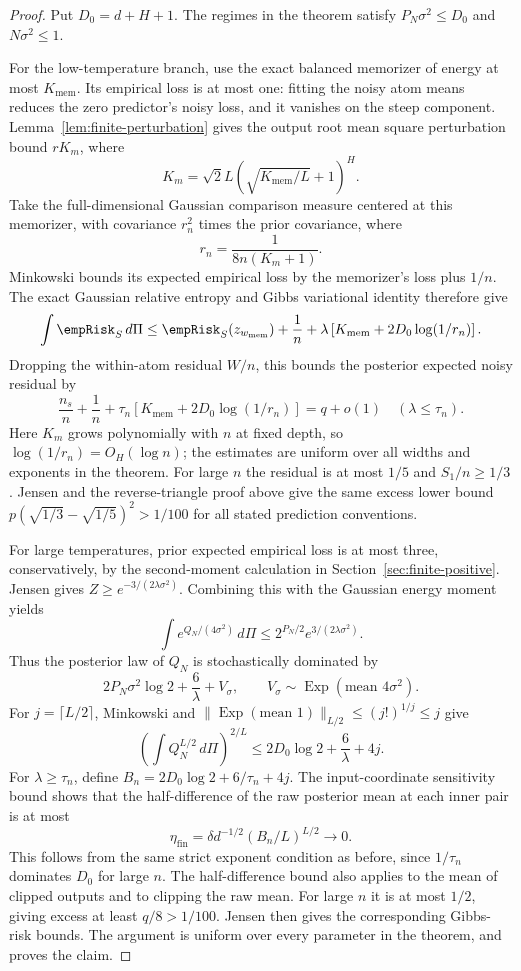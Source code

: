 \begin{proof}
Put $D_0=d+H+1$. The regimes in the theorem satisfy $P_N\sigma^2\le D_0$ and $N\sigma^2\le1$.

For the low-temperature branch, use the exact balanced memorizer of energy at most $K_{\mathrm{mem}}$. Its empirical loss is at most one: fitting the noisy atom means reduces the zero predictor's noisy loss, and it vanishes on the steep component. Lemma~\ref{lem:finite-perturbation} gives the output root mean square perturbation bound $rK_m$, where
\[
 K_m=\sqrt2 L(\sqrt{K_{\mathrm{mem}}/L}+1)^H.
\]
Take the full-dimensional Gaussian comparison measure centered at this memorizer, with covariance $r_n^2$ times the prior covariance, where
\[
 r_n=\frac1{8n(K_m+1)}.
\]
Minkowski bounds its expected empirical loss by the memorizer's loss plus $1/n$. The exact Gaussian relative entropy and Gibbs variational identity therefore give
\[
 \int\empRisk_S\,d\Pi\le
 \empRisk_S(z_{w_{\mathrm{mem}}})+\frac1n
   +\lambda\left[K_{\mathrm{mem}}+2D_0\log(1/r_n)\right].
\]
Dropping the within-atom residual $W/n$, this bounds the posterior expected noisy residual by
\[
 \frac{n_s}n+\frac1n+
       \tau_n\left[K_{\mathrm{mem}}+2D_0\log(1/r_n)\right]
       =q+o(1)
 \quad(\lambda\le\tau_n).
\]
Here $K_m$ grows polynomially with $n$ at fixed depth, so $\log(1/r_n)=O_H(\log n)$; the estimates are uniform over all widths and exponents in the theorem. For large $n$ the residual is at most $1/5$ and $S_1/n\ge1/3$. Jensen and the reverse-triangle proof above give the same excess lower bound $p(\sqrt{1/3}-\sqrt{1/5})^2>1/100$ for all stated prediction conventions.

For large temperatures, prior expected empirical loss is at most three, conservatively, by the second-moment calculation in Section~\ref{sec:finite-positive}. Jensen gives $Z\ge e^{-3/(2\lambda\sigma^2)}$. Combining this with the Gaussian energy moment yields
\[
 \int e^{Q_N/(4\sigma^2)}\,d\Pi
      \le2^{P_N/2}e^{3/(2\lambda\sigma^2)}.
\]
Thus the posterior law of $Q_N$ is stochastically dominated by
\[
 2P_N\sigma^2\log2+\frac6\lambda+V_\sigma,
 \qquad V_\sigma\sim\operatorname{Exp}(\text{mean }4\sigma^2).
\]
For $j=\lceil L/2\rceil$, Minkowski and
$\|\operatorname{Exp}(\text{mean }1)\|_{L/2}\le(j!)^{1/j}\le j$
give
\[
 \left(\int Q_N^{L/2}\,d\Pi\right)^{2/L}
    \le2D_0\log2+\frac6\lambda+4j.
\]
For $\lambda\ge\tau_n$, define $B_n=2D_0\log2+6/\tau_n+4j$.
The input-coordinate sensitivity bound shows that the half-difference of the raw posterior mean at each inner pair is at most
\[
 \eta_{\mathrm{fin}}=\delta d^{-1/2}(B_n/L)^{L/2}\longrightarrow0.
\]
This follows from the same strict exponent condition as before, since $1/\tau_n$ dominates $D_0$ for large $n$. The half-difference bound also applies to the mean of clipped outputs and to clipping the raw mean. For large $n$ it is at most $1/2$, giving excess at least $q/8>1/100$. Jensen then gives the corresponding Gibbs-risk bounds. The argument is uniform over every parameter in the theorem, and proves the claim.
\end{proof}
